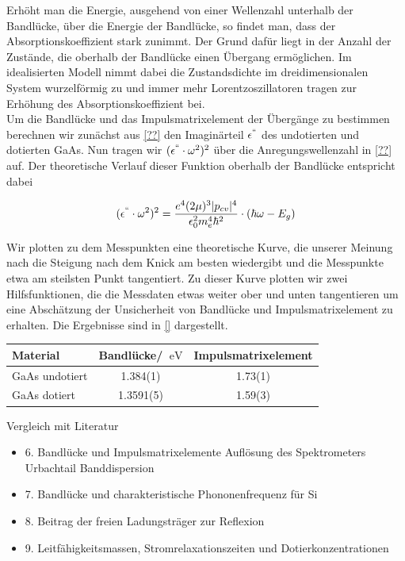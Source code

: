 \documentclass[paper=a4,fontsize=10pt,DIV=18,twocolumn,parskip=half]{scrartcl}
\numberwithin{equation}{section}    %
\begin{document}
Erhöht man die Energie, ausgehend von einer Wellenzahl unterhalb der Bandlücke, über die Energie der Bandlücke, so findet man, dass der Absorptionskoeffizient stark zunimmt. Der Grund dafür liegt in der Anzahl der Zustände, die oberhalb der Bandlücke einen Übergang ermöglichen. Im idealisierten Modell nimmt dabei die Zustandsdichte im dreidimensionalen System wurzelförmig zu und immer mehr Lorentzoszillatoren tragen zur Erhöhung des Absorptionskoeffizient bei.\\
Um die Bandlücke und das Impulsmatrixelement der Übergänge zu bestimmen berechnen wir zunächst aus \cref{??} den Imaginärteil $\epsilon^{``}$ des undotierten und dotierten GaAs. Nun tragen wir $(\epsilon^{``}\cdot \omega^2)^2$ über die Anregungswellenzahl in \cref{??} auf. Der theoretische Verlauf dieser Funktion oberhalb der Bandlücke entspricht dabei

\begin{align}
   (\epsilon^{``}\cdot \omega^2)^2=\frac{e^4 (2\mu)^3 |p_{cv}|^4}{\epsilon_0^2 m_e^4 \hbar^2} \cdot (\hbar \omega - E_g)
\end{align}

Wir plotten zu dem Messpunkten eine theoretische Kurve, die unserer Meinung nach die Steigung nach dem Knick am besten wiedergibt und die Messpunkte etwa am steilsten Punkt tangentiert. Zu dieser Kurve plotten wir zwei Hilfsfunktionen, die die Messdaten etwas weiter ober und unten tangentieren um eine Abschätzung der Unsicherheit von Bandlücke und Impulsmatrixelement zu erhalten.
Die Ergebnisse sind in \cref{} dargestellt.

\begin{tabular}{ l | c c }
  Material & Bandlücke/ $\SI{}{\eV}$ & Impulsmatrixelement\\
  \hline
  GaAs undotiert & 1.384(1) & 1.73(1) \\
  GaAs dotiert & 1.3591(5) & 1.59(3) \\
\end{tabular}

Vergleich mit Literatur


\begin{itemize}
\item 6. Bandlücke und Impulsmatrixelemente
Auflösung des Spektrometers
Urbachtail 
Banddispersion
\item 7. Bandlücke und charakteristische Phononenfrequenz für Si
\item 8. Beitrag der freien Ladungsträger zur Reflexion
\item 9. Leitfähigkeitsmassen, Stromrelaxationszeiten und Dotierkonzentrationen
\end{itemize}
\end{document}
